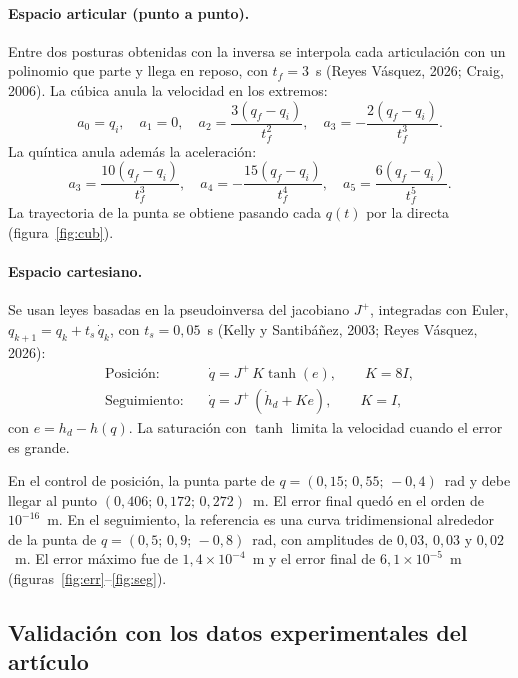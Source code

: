 \documentclass[11pt,a4paper]{article}
\begin{document}
\paragraph{Espacio articular (punto a punto).} Entre dos posturas obtenidas con la inversa se interpola cada articulación con un polinomio que parte y llega en reposo, con \(t_f=3\)~s (Reyes Vásquez, 2026; Craig, 2006). La cúbica anula la velocidad en los extremos:
\begin{equation}
a_0=q_i,\quad a_1=0,\quad a_2=\frac{3(q_f-q_i)}{t_f^2},\quad a_3=-\frac{2(q_f-q_i)}{t_f^3}.
\end{equation}
La quíntica anula además la aceleración:
\begin{equation}
a_3=\frac{10(q_f-q_i)}{t_f^3},\quad a_4=-\frac{15(q_f-q_i)}{t_f^4},\quad a_5=\frac{6(q_f-q_i)}{t_f^5}.
\end{equation}
La trayectoria de la punta se obtiene pasando cada \(q(t)\) por la directa (figura~\ref{fig:cub}).

\paragraph{Espacio cartesiano.} Se usan leyes basadas en la pseudoinversa del jacobiano \(J^{+}\), integradas con Euler, \(q_{k+1}=q_k+t_s\,\dot q_k\), con \(t_s=0{,}05\)~s (Kelly y Santibáñez, 2003; Reyes Vásquez, 2026):
\begin{align}
\text{Posición:}\quad &\dot q = J^{+}\,K\tanh(e),\qquad K=8I,\\
\text{Seguimiento:}\quad &\dot q = J^{+}\,(\dot h_d+K e),\qquad K=I,
\end{align}
con \(e=h_d-h(q)\). La saturación con \(\tanh\) limita la velocidad cuando el error es grande.

En el control de posición, la punta parte de \(q=(0{,}15;\,0{,}55;\,-0{,}4)\)~rad y debe llegar al punto \((0{,}406;\,0{,}172;\,0{,}272)\)~m. El error final quedó en el orden de \(10^{-16}\)~m. En el seguimiento, la referencia es una curva tridimensional alrededor de la punta de \(q=(0{,}5;\,0{,}9;\,-0{,}8)\)~rad, con amplitudes de \(0{,}03\), \(0{,}03\) y \(0{,}02\)~m. El error máximo fue de \(1{,}4\times 10^{-4}\)~m y el error final de \(6{,}1\times 10^{-5}\)~m (figuras~\ref{fig:err}--\ref{fig:seg}).

\subsection{Validación con los datos experimentales del artículo}
\end{document}
